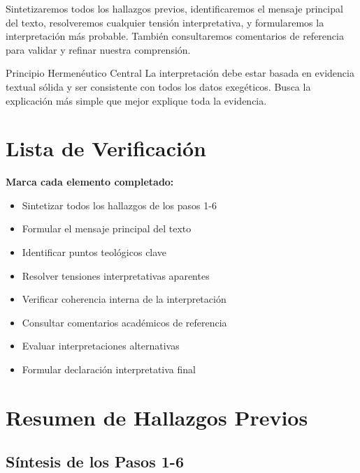 \documentclass[11pt,a4paper]{article}
\begin{document}
Sintetizaremos todos los hallazgos previos, identificaremos el mensaje principal del texto, resolveremos cualquier tensión interpretativa, y formularemos la interpretación más probable. También consultaremos comentarios de referencia para validar y refinar nuestra comprensión.

\begin{infobox}{Principio Hermenéutico Central}
La interpretación debe estar basada en evidencia textual sólida y ser consistente con todos los datos exegéticos. Busca la explicación más simple que mejor explique toda la evidencia.
\end{infobox}

\section{Lista de Verificación}

\begin{checklistbox}
\textbf{Marca cada elemento completado:}

\begin{itemize}[leftmargin=1cm]
    \item[$\square$] Sintetizar todos los hallazgos de los pasos 1-6
    \item[$\square$] Formular el mensaje principal del texto
    \item[$\square$] Identificar puntos teológicos clave
    \item[$\square$] Resolver tensiones interpretativas aparentes
    \item[$\square$] Verificar coherencia interna de la interpretación
    \item[$\square$] Consultar comentarios académicos de referencia
    \item[$\square$] Evaluar interpretaciones alternativas
    \item[$\square$] Formular declaración interpretativa final
\end{itemize}
\end{checklistbox}

\newpage

\section{Resumen de Hallazgos Previos}

\subsection{Síntesis de los Pasos 1-6}
\end{document}
